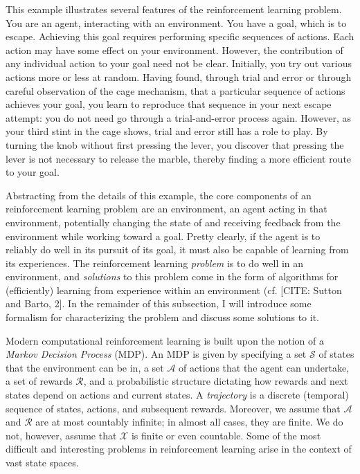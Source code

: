 This example illustrates several features of the reinforcement learning problem.
You are an agent, interacting with an environment.
You have a goal, which is to escape.
Achieving this goal requires performing specific sequences of actions.
Each action may have some effect on your environment.
However, the contribution of any individual action to your goal need not be clear.
Initially, you try out various actions more or less at random.
Having found, through trial and error or through careful observation of the cage mechanism, that a particular sequence of actions achieves your goal, you learn to reproduce that sequence in your next escape attempt: you do not need go through a trial-and-error process again.
However, as your third stint in the cage shows, trial and error still has a role to play.
By turning the knob without first pressing the lever, you discover that pressing the lever is not necessary to release the marble, thereby finding a more efficient route to your goal.

Abstracting from the details of this example, the core components of an reinforcement learning problem are an environment, an agent acting in that environment, potentially changing the state of and receiving feedback from the environment while working toward a goal.
Pretty clearly, if the agent is to reliably do well in its pursuit of its goal, it must also be capable of learning from its experiences.
The reinforcement learning \emph{problem} is to do well in an environment, and \emph{solutions} to this problem come in the form of algorithms for (efficiently) learning from experience within an environment (cf. [CITE: Sutton and Barto, 2].
In the remainder of this subsection, I will introduce some formalism for characterizing the problem and discuss some solutions to it.

Modern computational reinforcement learning is built upon the notion of a \emph{Markov Decision Process} (MDP).
An MDP is given by specifying a set $\mathcal S$ of states that the environment can be in, a set $\mathcal A$ of actions that the agent can undertake, a set of rewards $\mathcal R$, and a probabilistic structure dictating how rewards and next states depend on actions and current states.
A \emph{trajectory} is a discrete (temporal) sequence of states, actions, and subsequent rewards.
Moreover, we assume that $\mathcal A$ and $\mathcal R$ are at most countably infinite; in almost all cases, they are finite.
We do not, however, assume that $\mathcal X$ is finite or even countable.
Some of the most difficult and interesting problems in reinforcement learning arise in the context of vast state spaces.

